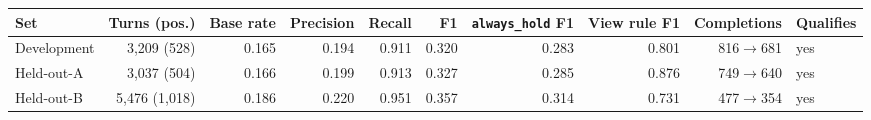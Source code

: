 \begin{tabular}{lrrrrrrrrl}
\toprule
Set & Turns (pos.) & Base rate & Precision & Recall & F1 & \texttt{always\_hold} F1 & View rule F1 & Completions & Qualifies \\
\midrule
Development & 3{,}209 (528) & 0.165 & 0.194 & 0.911 & 0.320 & 0.283 & 0.801 & 816$\to$681 & yes \\
Held-out-A & 3{,}037 (504) & 0.166 & 0.199 & 0.913 & 0.327 & 0.285 & 0.876 & 749$\to$640 & yes \\
Held-out-B & 5{,}476 (1{,}018) & 0.186 & 0.220 & 0.951 & 0.357 & 0.314 & 0.731 & 477$\to$354 & yes \\
\bottomrule
\end{tabular}
